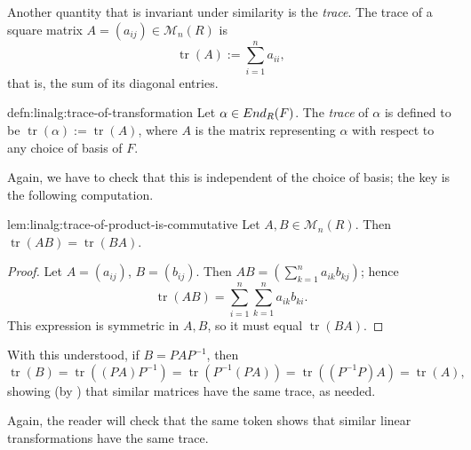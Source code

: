 Another quantity that is invariant under similarity is the
\emph{trace}. The trace of a square matrix
$A = (a_{ij}) \in \mathcal{M}_n(R)$ is
\[
  \operatorname{tr}(A) := \sum_{i=1}^n a_{ii},
\]
that is, the sum of its diagonal entries.
\begin{defn}{}{defn:linalg:trace-of-transformation}
  Let $\alpha \in End_R(F)$. The \emph{trace} of $\alpha$ is defined
  to be $\operatorname{tr}(\alpha) := \operatorname{tr}(A)$, where $A$
  is the matrix representing $\alpha$ with respect to any choice of
  basis of $F$.
\end{defn}
Again, we have to check that this is independent of the choice of
basis; the key is the following computation.
\begin{lem}{}{lem:linalg:trace-of-product-is-commutative}
  Let $A, B \in \mathcal{M}_n(R)$. Then
  $\operatorname{tr}(AB) = \operatorname{tr}(BA)$.
\end{lem}
\begin{proof}
  Let $A = (a_{ij})$, $B = (b_{ij})$. Then
  $AB = (\sum_{k=1}^n a_{ik}b_{kj})$; hence
  \[
    \operatorname{tr}(AB) = \sum_{i=1}^n \sum_{k=1}^n a_{ik}b_{ki}.
  \]
  This expression is symmetric in $A, B$, so it must equal
  $\operatorname{tr}(BA)$.
\end{proof}

With this understood, if $B = PAP^{-1}$, then
\[
  \operatorname{tr}(B) = \operatorname{tr}((PA)P^{-1}) =
  \operatorname{tr}(P^{-1}(PA)) = \operatorname{tr}((P^{-1}P)A) =
  \operatorname{tr}(A),
\]
showing (by ) that similar matrices have the same
trace, as needed.

Again, the reader will check that the same token shows that similar
linear transformations have the same trace.

